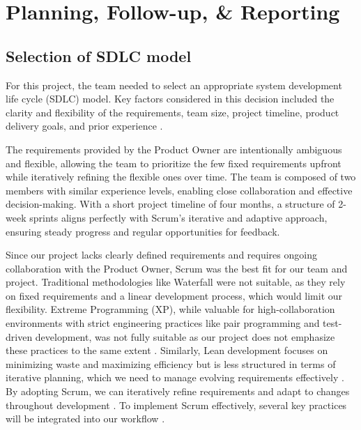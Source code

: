 \section{Planning, Follow-up, \& Reporting}

\subsection{Selection of SDLC model}

For this project, the team needed to select an appropriate system development life cycle (SDLC) model. Key factors considered in this decision included the clarity and flexibility of the requirements, team size, project timeline, product delivery goals, and prior experience \cite{sdlc_model}. 

The requirements provided by the Product Owner are intentionally ambiguous and flexible, allowing the team to prioritize the few fixed requirements upfront while iteratively refining the flexible ones over time. The team is composed of two members with similar experience levels, enabling close collaboration and effective decision-making. With a short project timeline of four months, a structure of 2-week sprints aligns perfectly with Scrum's iterative and adaptive approach, ensuring steady progress and regular opportunities for feedback. 

Since our project lacks clearly defined requirements and requires ongoing collaboration with the Product Owner, Scrum was the best fit for our team and project. Traditional methodologies like Waterfall were not suitable, as they rely on fixed requirements and a linear development process, which would limit our flexibility. Extreme Programming (XP), while valuable for high-collaboration environments with strict engineering practices like pair programming and test-driven development, was not fully suitable as our project does not emphasize these practices to the same extent \cite{extreme_programming}. Similarly, Lean development focuses on minimizing waste and maximizing efficiency but is less structured in terms of iterative planning, which we need to manage evolving requirements effectively \cite{lean_programming}. By adopting Scrum, we can iteratively refine requirements and adapt to changes throughout development \cite{sdlc_model}. To implement Scrum effectively, several key practices will be integrated into our workflow \cite{scrum_guide}.

